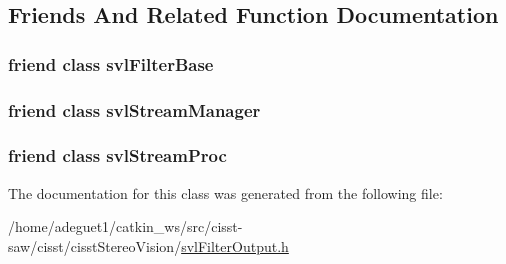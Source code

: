 \subsection{Friends And Related Function Documentation}
\hypertarget{classsvl_filter_output_aadcba5e897486de2d761520b866f4ac0}{
\subsubsection[{svl\-Filter\-Base}]{\setlength{\rightskip}{0pt plus 5cm}friend class {\bf svl\-Filter\-Base}\hspace{0.3cm}{\ttfamily [friend]}}}\label{classsvl_filter_output_aadcba5e897486de2d761520b866f4ac0}
\hypertarget{classsvl_filter_output_ab5eee58544f2ce644140e932afbe32db}{
\subsubsection[{svl\-Stream\-Manager}]{\setlength{\rightskip}{0pt plus 5cm}friend class {\bf svl\-Stream\-Manager}\hspace{0.3cm}{\ttfamily [friend]}}}\label{classsvl_filter_output_ab5eee58544f2ce644140e932afbe32db}
\hypertarget{classsvl_filter_output_a6a9ee1dec5ca263793dca09411295245}{
\subsubsection[{svl\-Stream\-Proc}]{\setlength{\rightskip}{0pt plus 5cm}friend class {\bf svl\-Stream\-Proc}\hspace{0.3cm}{\ttfamily [friend]}}}\label{classsvl_filter_output_a6a9ee1dec5ca263793dca09411295245}


The documentation for this class was generated from the following file\-:\begin{DoxyCompactItemize}
\item 
/home/adeguet1/catkin\-\_\-ws/src/cisst-\/saw/cisst/cisst\-Stereo\-Vision/\hyperlink{svl_filter_output_8h}{svl\-Filter\-Output.\-h}\end{DoxyCompactItemize}

